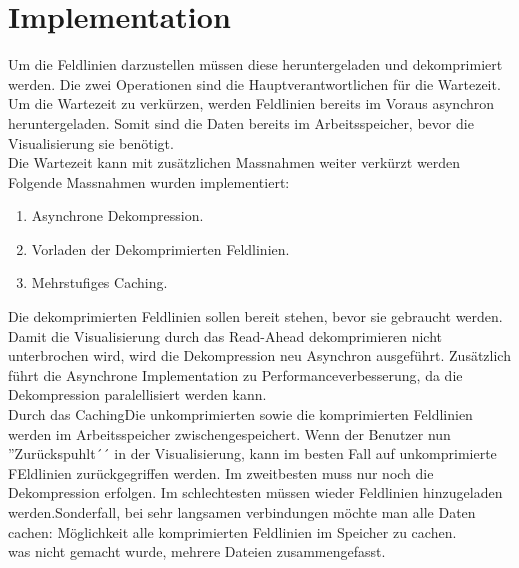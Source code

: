 \section{Implementation}
Um die Feldlinien darzustellen müssen diese heruntergeladen und dekomprimiert werden. Die zwei Operationen sind die Hauptverantwortlichen für die Wartezeit. Um die Wartezeit zu verkürzen, werden Feldlinien bereits im Voraus asynchron heruntergeladen. Somit sind die Daten bereits im Arbeitsspeicher, bevor die Visualisierung sie benötigt.\\
Die Wartezeit kann mit zusätzlichen Massnahmen weiter verkürzt werden Folgende Massnahmen wurden implementiert:
\begin{enumerate}
	\item Asynchrone Dekompression.
	\item Vorladen der Dekomprimierten Feldlinien.
	\item Mehrstufiges Caching.
\end{enumerate}
Die dekomprimierten Feldlinien sollen bereit stehen, bevor sie gebraucht werden.\\
Damit die Visualisierung durch das Read-Ahead dekomprimieren nicht unterbrochen wird, wird die Dekompression neu Asynchron ausgeführt. Zusätzlich führt die Asynchrone Implementation zu Performanceverbesserung, da die Dekompression paralellisiert werden kann.\\
Durch das CachingDie unkomprimierten sowie die komprimierten Feldlinien werden im Arbeitsspeicher zwischengespeichert. Wenn der Benutzer nun ''Zurückspuhlt´´ in der Visualisierung, kann im besten Fall auf unkomprimierte FEldlinien zurückgegriffen werden. Im zweitbesten muss nur noch die Dekompression erfolgen. Im schlechtesten müssen wieder Feldlinien hinzugeladen werden.Sonderfall, bei sehr langsamen verbindungen möchte man alle Daten cachen: Möglichkeit alle komprimierten Feldlinien im Speicher zu cachen.\\

was nicht gemacht wurde, mehrere Dateien zusammengefasst.

